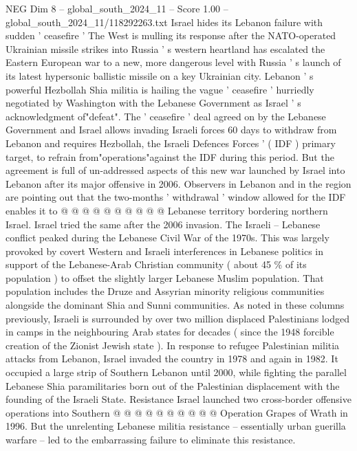 \begin{textsample}{NEG Dim 8 – global\_south\_2024\_11 – Score 1.00 – global\_south\_2024\_11/118292263.txt}  \label{ex:f8_neg_297}
Israel hides its Lebanon failure with sudden ' ceasefire ' The West is mulling its response after the NATO-operated Ukrainian missile strikes into Russia ' s western heartland has escalated the Eastern European war to a new, more dangerous level with Russia ' s launch of its latest hypersonic ballistic missile on a key Ukrainian city.
Lebanon ' s powerful Hezbollah Shia militia is hailing the vague ' ceasefire ' hurriedly negotiated by Washington with the Lebanese Government as Israel ' s acknowledgment of"defeat".
The ' ceasefire ' deal agreed on by the Lebanese Government and Israel allows invading Israeli forces 60 days to withdraw from Lebanon and requires Hezbollah, the Israeli Defences Forces ' ( IDF ) primary target, to refrain from"operations"against the IDF during this period.
But the agreement is full of un-addressed aspects of this new war launched by Israel into Lebanon after its major offensive in 2006.
Observers in Lebanon and in the region are pointing out that the two-months ' withdrawal ' window allowed for the IDF enables it to @ @ @ @ @ @ @ @ @ @ Lebanese territory bordering northern Israel.
Israel tried the same after the 2006 invasion.
The Israeli -- Lebanese conflict peaked during the Lebanese Civil War of the 1970s.
This was largely provoked by covert Western and Israeli interferences in Lebanese politics in support of the Lebanese-Arab Christian community ( about 45 \% of its population ) to offset the slightly larger Lebanese Muslim population.
That population includes the Druze and Assyrian minority religious communities alongside the dominant Shia and Sunni communities.
As noted in these columns previously, Israeli is surrounded by over two million displaced Palestinians lodged in camps in the neighbouring Arab states for decades ( since the 1948 forcible creation of the Zionist Jewish state ).
In response to refugee Palestinian militia attacks from Lebanon, Israel invaded the country in 1978 and again in 1982.
It occupied a large strip of Southern Lebanon until 2000, while fighting the parallel Lebanese Shia paramilitaries born out of the Palestinian displacement with the founding of the Israeli State.
Resistance Israel launched two cross-border offensive operations into Southern @ @ @ @ @ @ @ @ @ @ Operation Grapes of Wrath in 1996.
But the unrelenting Lebanese militia resistance -- essentially urban guerilla warfare -- led to the embarrassing failure to eliminate this resistance.

\end{textsample}
